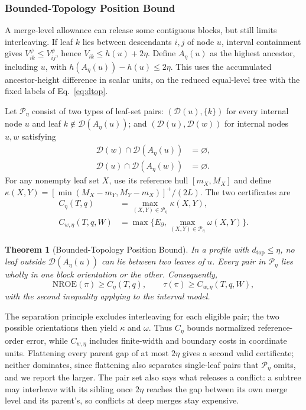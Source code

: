 \documentclass{vgtc}                %
\newtheorem{theorem}{Theorem}
\newcommand{\dtop}{d_{\mathrm{top}}}
\newcommand{\nroe}{\mathrm{NROE}}
\begin{document}


\subsubsection{Bounded-Topology Position Bound}
A merge-level allowance can release some contiguous blocks, but still limits interleaving. If leaf $k$ lies between descendants $i,j$ of node $u$, interval containment gives $V_{ik}^{\psi}\le V_{ij}^{\psi}$, hence $V_{ik}\le h(u)+2\eta$. Define $A_\eta(u)$ as the highest ancestor, including $u$, with $h(A_\eta(u))-h(u)\le2\eta$. This uses the accumulated ancestor-height difference in scalar units, on the reduced equal-level tree with the fixed labels of Eq.~\ref{eq:dtop}.

Let $\mathcal{P}_\eta$ consist of two types of leaf-set pairs: $(\mathcal{D}(u),\{k\})$ for every internal node $u$ and leaf $k\notin\mathcal{D}(A_\eta(u))$; and $(\mathcal{D}(u),\mathcal{D}(w))$ for internal nodes $u,w$ satisfying
\begin{equation}\label{eq:separatedpairs}
\begin{aligned}
 \mathcal{D}(w)\cap\mathcal{D}(A_\eta(u))&=\varnothing,\\
 \mathcal{D}(u)\cap\mathcal{D}(A_\eta(w))&=\varnothing.
\end{aligned}
\end{equation}
For any nonempty leaf set $X$, use its reference hull $[m_X,M_X]$ and define $\kappa(X,Y)=[\min(M_X-m_Y,M_Y-m_X)]^+/(2L)$. The two certificates are
\begin{equation}\label{eq:chaindef}
\begin{aligned}
 C_\eta(T,q)&=\max_{(X,Y)\in\mathcal{P}_\eta}\kappa(X,Y),\\
 C_{w,\eta}(T,q,W)&=\max\{E_\partial,\max_{(X,Y)\in\mathcal{P}_\eta}\omega(X,Y)\}.
\end{aligned}
\end{equation}
\begin{theorem}[Bounded-Topology Position Bound]\label{thm:chain}
In a profile with $\dtop\le\eta$, no leaf outside $\mathcal{D}(A_\eta(u))$ can lie between two leaves of $u$. Every pair in $\mathcal{P}_\eta$ lies wholly in one block orientation or the other. Consequently,
\begin{equation}\label{eq:chainbounds}
 \nroe(\pi)\ge C_\eta(T,q),\qquad
 \tau(\pi)\ge C_{w,\eta}(T,q,W),
\end{equation}
with the second inequality applying to the interval model.
\end{theorem}
The separation principle excludes interleaving for each eligible pair; the two possible orientations then yield $\kappa$ and $\omega$. Thus $C_\eta$ bounds normalized reference-order error, while $C_{w,\eta}$ includes finite-width and boundary costs in coordinate units. Flattening every parent gap of at most $2\eta$ gives a second valid certificate; neither dominates, since flattening also separates single-leaf pairs that $\mathcal{P}_\eta$ omits, and we report the larger. The pair set also says what releases a conflict: a subtree may interleave with its sibling once $2\eta$ reaches the gap between its own merge level and its parent's, so conflicts at deep merges stay expensive.
\end{document}
